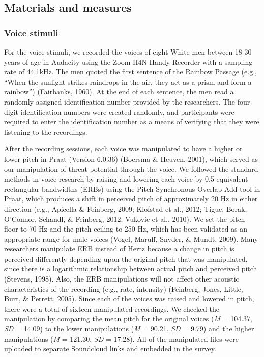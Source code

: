 \documentclass[
  english,
  man]{apa6}
\begin{document}
\hypertarget{materials-and-measures}{%
\subsection{Materials and measures}\label{materials-and-measures}}

\hypertarget{voice-stimuli}{%
\subsubsection{Voice stimuli}\label{voice-stimuli}}

For the voice stimuli, we recorded the voices of eight White men between 18-30 years of age in Audacity using the Zoom H4N Handy Recorder with a sampling rate of 44.1kHz. The men quoted the first sentence of the Rainbow Passage (e.g., \enquote{When the sunlight strikes raindrops in the air, they act as a prism and form a rainbow}) (Fairbanks, 1960). At the end of each sentence, the men read a randomly assigned identification number provided by the researchers. The four-digit identification numbers were created randomly, and participants were required to enter the identification number as a means of verifying that they were listening to the recordings.

After the recording sessions, each voice was manipulated to have a higher or lower pitch in Praat (Version 6.0.36) (Boersma \& Heuven, 2001), which served as our manipulation of threat potential through the voice. We followed the standard methods in voice research by raising and lowering each voice by 0.5 equivalent rectangular bandwidths (ERBs) using the Pitch-Synchronous Overlap Add tool in Praat, which produces a shift in perceived pitch of approximately 20 Hz in either direction (e.g., Apicella \& Feinberg, 2009; Klofstad et al., 2012; Tigue, Borak, O'Connor, Schandl, \& Feinberg, 2012; Vukovic et al., 2010). We set the pitch floor to 70 Hz and the pitch ceiling to 250 Hz, which has been validated as an appropriate range for male voices (Vogel, Maruff, Snyder, \& Mundt, 2009). Many researchers manipulate ERB instead of Hertz because a change in pitch is perceived differently depending upon the original pitch that was manipulated, since there is a logarithmic relationship between actual pitch and perceived pitch (Stevens, 1998). Also, the ERB manipulations will not affect other acoustic characteristics of the recording (e.g., rate, intensity) (Feinberg, Jones, Little, Burt, \& Perrett, 2005). Since each of the voices was raised and lowered in pitch, there were a total of sixteen manipulated recordings. We checked the manipulation by comparing the mean pitch for the original voices (\emph{M} = 104.37, \emph{SD} = 14.09) to the lower manipulations (\emph{M} = 90.21, \emph{SD} = 9.79) and the higher manipulations (\emph{M} = 121.30, \emph{SD} = 17.28). All of the manipulated files were uploaded to separate Soundcloud links and embedded in the survey.
\end{document}
